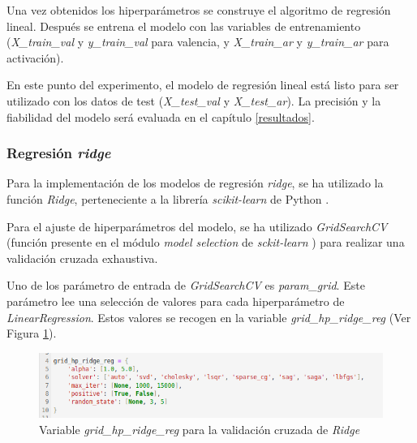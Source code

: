 \documentclass[12pt,a4paper]{article}
\begin{document}
Una vez obtenidos los hiperparámetros se construye el algoritmo de regresión lineal. Después se entrena el modelo con las variables de entrenamiento (\textit{X\_train\_val} y \textit{y\_train\_val} para valencia, y \textit{X\_train\_ar} y \textit{y\_train\_ar} para activación).


En este punto del experimento, el modelo de regresión lineal está listo para ser utilizado con los datos de test (\textit{X\_test\_val} y \textit{X\_test\_ar}). La precisión y la fiabilidad del modelo será evaluada en el capítulo \ref{resultados}.

\subsubsection{Regresión \textit{ridge}}
Para la implementación de los modelos de regresión \textit{ridge}, se ha utilizado la función \textit{Ridge}, perteneciente a la librería \textit{scikit-learn} de Python \cite{scikit-learn}.


Para el ajuste de hiperparámetros del modelo, se ha utilizado \textit{GridSearchCV} (función presente en el módulo \textit{model selection} de \textit{sckit-learn} \cite{scikit-learn}) para realizar una validación cruzada exhaustiva.

Uno de los parámetro de entrada de \textit{GridSearchCV} es \textit{param\_grid}. Este parámetro lee una selección de valores para cada hiperparámetro de \textit{LinearRegression}. Estos valores se recogen en la variable \textit{grid\_hp\_ridge\_reg} (Ver Figura \ref{fig:paramsridge}).
\begin{figure}[H]
	\centering
	\includegraphics[width=0.7\linewidth]{figs/params_ridge}
	\caption{Variable \textit{grid\_hp\_ridge\_reg} para la validación cruzada de \textit{Ridge}}
	\label{fig:paramsridge}
\end{figure}
\end{document}
